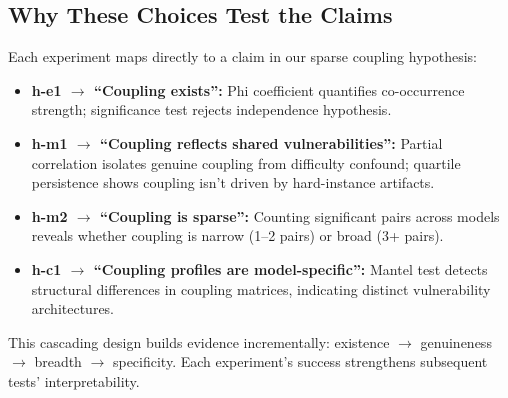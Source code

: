 \subsection{Why These Choices Test the Claims}

Each experiment maps directly to a claim in our sparse coupling hypothesis:

\begin{itemize}
\item \textbf{h-e1 $\rightarrow$ ``Coupling exists'':} Phi coefficient quantifies co-occurrence strength; significance test rejects independence hypothesis.
\item \textbf{h-m1 $\rightarrow$ ``Coupling reflects shared vulnerabilities'':} Partial correlation isolates genuine coupling from difficulty confound; quartile persistence shows coupling isn't driven by hard-instance artifacts.
\item \textbf{h-m2 $\rightarrow$ ``Coupling is sparse'':} Counting significant pairs across models reveals whether coupling is narrow (1--2 pairs) or broad (3+ pairs).
\item \textbf{h-c1 $\rightarrow$ ``Coupling profiles are model-specific'':} Mantel test detects structural differences in coupling matrices, indicating distinct vulnerability architectures.
\end{itemize}

This cascading design builds evidence incrementally: existence $\rightarrow$ genuineness $\rightarrow$ breadth $\rightarrow$ specificity. Each experiment's success strengthens subsequent tests' interpretability.
